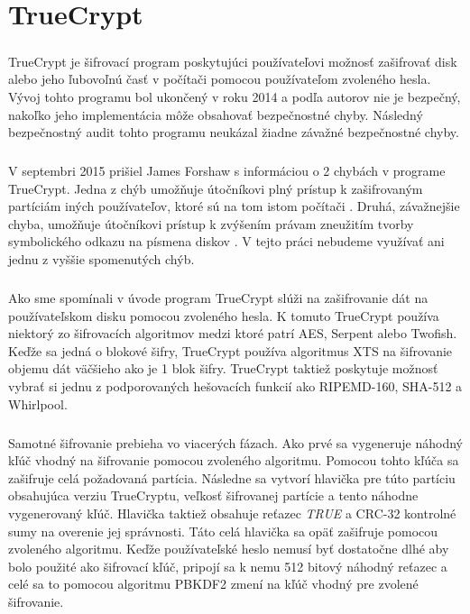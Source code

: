 \chapter{TrueCrypt}
\paragraph{}
TrueCrypt je šifrovací program poskytujúci používateľovi možnosť zašifrovať disk alebo jeho ľubovoľnú časť v počítači pomocou používateľom zvoleného hesla. Vývoj tohto programu bol ukončený v roku 2014 a podľa autorov nie je bezpečný, nakoľko jeho implementácia môže obsahovať bezpečnostné chyby. Následný bezpečnostný audit tohto programu neukázal žiadne závažné bezpečnostné chyby. 

\paragraph{}
V septembri 2015 prišiel James Forshaw s informáciou o 2 chybách v programe TrueCrypt. Jedna z chýb umožňuje útočníkovi plný prístup k zašifrovaným partíciám iných používateľov, ktoré sú na tom istom počítači \cite{issue1}. Druhá, závažnejšie chyba, umožňuje útočníkovi prístup k zvýšením právam zneužitím tvorby symbolického odkazu na písmena diskov \cite{issue2}. V tejto práci nebudeme využívať ani jednu z vyššie spomenutých chýb.

\paragraph{}
Ako sme spomínali v úvode program TrueCrypt slúži na zašifrovanie dát na používateľskom disku pomocou zvoleného hesla. K tomuto TrueCrypt používa niektorý zo šifrovacích algoritmov medzi ktoré patrí AES, Serpent alebo Twofish. Keďže sa jedná o blokové šifry, TrueCrypt používa algoritmus XTS na šifrovanie objemu dát väčšieho ako je 1 blok šifry. TrueCrypt taktiež poskytuje možnosť vybrať si jednu z podporovaných hešovacích funkcií ako RIPEMD-160, SHA-512 a Whirlpool.

\paragraph{}
Samotné šifrovanie prebieha vo viacerých fázach. Ako prvé sa vygeneruje náhodný kľúč vhodný na šifrovanie pomocou zvoleného algoritmu. Pomocou tohto kľúča sa zašifruje celá požadovaná partícia. Následne sa vytvorí hlavička pre túto partíciu obsahujúca verziu TrueCryptu, veľkosť šifrovanej partície a tento náhodne vygenerovaný kľúč. Hlavička taktiež obsahuje reťazec \emph{TRUE} a CRC-32 kontrolné sumy na overenie jej správnosti. Táto celá hlavička sa opäť zašifruje pomocou zvoleného algoritmu. Keďže používateľské heslo nemusí byť dostatočne dlhé aby bolo použité ako šifrovací kľúč, pripojí sa k nemu 512 bitový náhodný reťazec a celé sa to pomocou algoritmu PBKDF2 zmení na kľúč vhodný pre zvolené šifrovanie.

